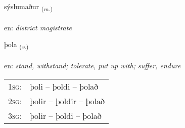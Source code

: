 \documentclass[frontgrid, backgrid]{flacards}\usepackage[]{graphicx}\usepackage[]{color}
\begin{document}
\renewcommand{\flhead}{\vskip5pt \fboxsep=0pt {\small\bfseries\footnotesize Nafnorð | Noun}}
\renewcommand{\fcfoot}{\vskip5pt \fboxsep=0pt \hspace{2pt}{\small\bfseries\footnotesize 2K}}

\renewcommand{\blhead}{\vskip5pt {\small\bfseries\footnotesize Nafnorð | Noun }}
\renewcommand{\bcfoot}{\vskip5pt \hspace{2pt}{\small\bfseries\footnotesize 2K}}


{sýslumaður \small{\textsubscript{(\textit{m.})}} \\[1ex] %
\textphonetic{[sistlʏmaðʏr]} \\
en: \emph{district magistrate} \\  [2ex]
\renewcommand*{\arraystretch}{0.8}
}

\renewcommand{\flhead}{\vskip5pt \fboxsep=0pt {\small\bfseries\footnotesize Sagnorð | Verb}}
\renewcommand{\fcfoot}{\vskip5pt \fboxsep=0pt \hspace{2pt}{\small\bfseries\footnotesize 2K}}

\renewcommand{\blhead}{\vskip5pt {\small\bfseries\footnotesize Sagnorð | Verb }}
\renewcommand{\bcfoot}{\vskip5pt \hspace{2pt}{\small\bfseries\footnotesize 2K}}


{þola \small{\textsubscript{(\textit{v.})}} \\[1ex] %
\textphonetic{[θɔːla]} \\
en: \emph{stand, withstand; tolerate, put up with; suffer, endure} \\  [2ex]
\renewcommand*{\arraystretch}{0.8}
\begin{tabular}{p{1cm}l}
\textsc{1sg}: & þoli -- þoldi -- þolað \\ 
\textsc{2sg}: & þolir -- þoldir -- þolað \\ 
\textsc{3sg}: & þolir -- þoldi -- þolað \\ 
\end{tabular}
}
\end{document}

